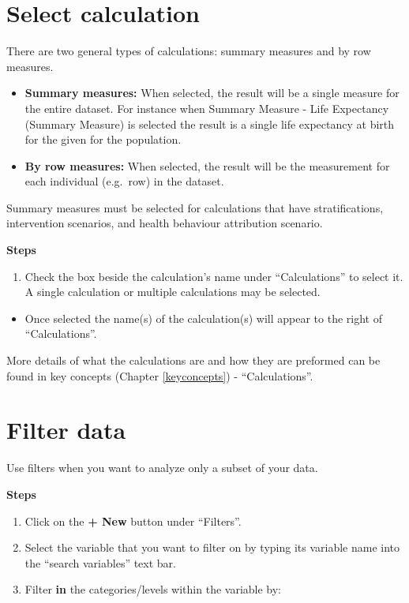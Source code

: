 \documentclass[]{book}
\providecommand{\tightlist}{%
  \setlength{\itemsep}{0pt}\setlength{\parskip}{0pt}}
\begin{document}
\section{Select calculation}\label{select-calculation}

There are two general types of calculations: summary measures and by row
measures.

\begin{itemize}
\item
  \textbf{Summary measures:} When selected, the result will be a single measure for
the entire dataset. For instance when Summary Measure - Life Expectancy
(Summary Measure) is selected the result is a single life expectancy at
birth for the given for the population.
\item
  \textbf{By row measures:} When selected, the result will be the measurement for
each individual (e.g.~row) in the dataset.
\end{itemize}

Summary measures must be selected for calculations that have
stratifications, intervention scenarios, and health behaviour
attribution scenario.

\textbf{Steps}

\begin{enumerate}
\def\labelenumi{\arabic{enumi}.}
\tightlist
\item
  Check the box beside the calculation's name under ``Calculations'' to
  select it. A single calculation or multiple calculations may be
  selected.
\end{enumerate}

\begin{itemize}
\tightlist
\item
  Once selected the name(s) of the calculation(s) will appear to the
  right of ``Calculations''.
\end{itemize}

More details of what the calculations are and how they are preformed can
be found in key concepts (Chapter \ref{keyconcepts}) - ``Calculations''.

\section{Filter data}\label{filter-data}

Use filters when you want to analyze only a subset of your data.

\textbf{Steps}

\begin{enumerate}
\def\labelenumi{\arabic{enumi}.}
\item
  Click on the \textbf{+ New} button under ``Filters''.
\item
  Select the variable that you want to filter on by typing its variable
  name into the ``search variables'' text bar.
\item
  Filter \textbf{in} the categories/levels within the variable by:
\end{enumerate}
\end{document}
